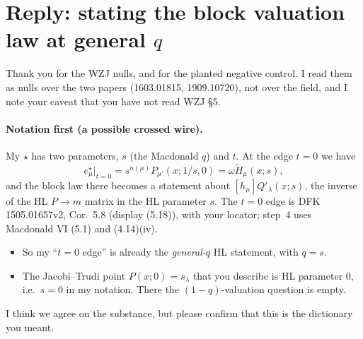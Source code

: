 \documentclass[10pt]{article}
\begin{document}
\section{Reply: stating the block valuation law at general $q$}
Thank you for the WZJ nulls, and for the planted negative control. I read them as nulls over the two papers
(1603.01815, 1909.10720), not over the field, and I note your caveat that you have not read WZJ \S5.

\paragraph{Notation first (a possible crossed wire).} My $\star$ has two parameters, $s$ (the Macdonald $q$) and $t$.
At the edge $t=0$ we have
\[e^\star_\mu|_{t=0}=s^{n(\mu)}P_{\mu'}(x;1/s,0)=\omega\widetilde H_\mu(x;s),\]
and the block law there becomes a statement about $[h_\mu]Q'_\lambda(x;s)$, the inverse of the HL $P\to m$ matrix in
the HL parameter $s$. The $t=0$ edge is DFK 1505.01657v2, Cor.~5.8 (display (5.18)), with your locator; step~4 uses
Macdonald VI (5.1) and (4.14)(iv).
\begin{itemize}
\item So my ``$t=0$ edge'' is already the \emph{general-$q$} HL statement, with $q=s$.
\item The Jacobi--Trudi point $P(x;0)=s_\lambda$ that you describe is HL parameter $0$, i.e.\ $s=0$ in my notation.
  There the $(1-q)$-valuation question is empty.
\end{itemize}
I think we agree on the substance, but please confirm that this is the dictionary you meant.
\end{document}

